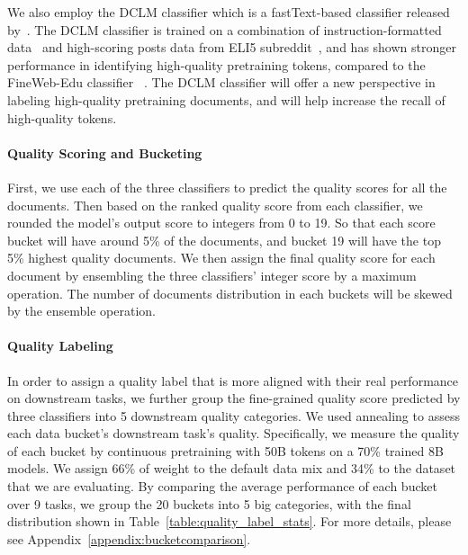 \documentclass[11pt]{article}
\begin{document}
 We also employ the DCLM classifier which is a fastText-based classifier released by~\citet{li2024datacomp}. The DCLM classifier is trained on a combination of instruction-formatted data~\citep{OpenHermes} and high-scoring posts data from ELI5 subreddit~\citep{fan2019eli5}, and has shown stronger performance in identifying high-quality pretraining tokens, compared to the FineWeb-Edu classifier ~\citep{penedo2024fineweb}. The DCLM classifier will offer a new perspective in labeling high-quality pretraining documents, and will help increase the recall of high-quality tokens.

\paragraph{Quality Scoring and Bucketing}
First, we use each of the three classifiers to predict the quality scores for all the documents. Then based on the ranked quality score from each classifier, we rounded the model's output score to integers from 0 to 19. So that each score bucket will have around 5\% of the documents, and bucket 19 will have the top 5\% highest quality documents. We then assign the final quality score for each document by ensembling the three classifiers' integer score by a maximum operation. The number of documents distribution in each buckets will be skewed by the ensemble operation.

\paragraph{Quality Labeling}
In order to assign a quality label that is more aligned with their real performance on downstream tasks, we further group the fine-grained quality score predicted by three classifiers into 5 downstream quality categories. We used annealing to assess each data bucket's downstream task's quality. Specifically, we measure the quality of each bucket by continuous pretraining with 50B tokens on a 70\% trained 8B models. We assign 66\% of weight to the default data mix and 34\% to the dataset that we are evaluating. By comparing the average performance of each bucket over 9 tasks, we group the 20 buckets into 5 big categories, with the final distribution shown in Table~\ref{table:quality_label_stats}. For more details, please see Appendix~\ref{appendix:bucketcomparison}.
\end{document}
